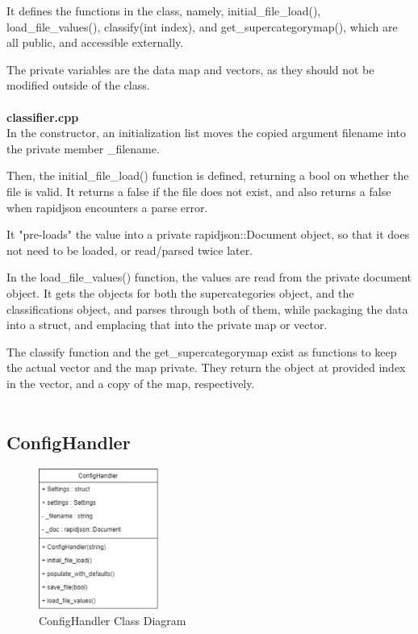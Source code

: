 \documentclass[conference]{IEEEtran}
\begin{document}
It defines the functions in the class, namely, initial\_file\_load(), load\_file\_values(), classify(int index), and get\_supercategorymap(), which are all public, and accessible externally.

The private variables are the data map and vectors, as they should not be modified outside of the class.~\\~\\


\textbf{classifier.cpp}~\\

In the constructor, an initialization list moves the copied argument filename into the private member \_filename. 

Then, the initial\_file\_load() function is defined, returning a bool on whether the file is valid. It returns a false if the file does not exist, and also returns a false when rapidjson encounters a parse error.

It "pre-loads" the value into a private rapidjson::Document object, so that it does not need to be loaded, or read/parsed twice later.

In the load\_file\_values() function, the values are read from the private document object. It gets the objects for both the supercategories object, and the classifications object, and parses through both of them, while packaging the data into a struct, and emplacing that into the private map or vector.

The classify function and the get\_supercategorymap exist as functions to keep the actual vector and the map private. They return the object at provided index in the vector, and a copy of the map, respectively.~\\~\\


\subsection{ConfigHandler}

\begin{figure}[h]
    \centering
    \includegraphics[width=0.35\textwidth]{images/code_diagrams/confighandler_uml.eps}
    \caption{ConfigHandler Class Diagram}
\end{figure}~\\
\end{document}

